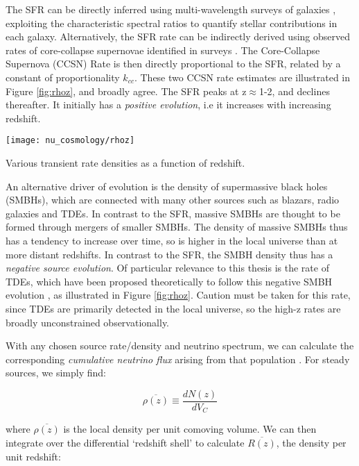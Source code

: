 The SFR can be directly inferred using multi-wavelength surveys of galaxies , exploiting the characteristic spectral ratios to quantify stellar contributions in each galaxy. Alternatively, the SFR rate can be indirectly derived using observed rates of core-collapse supernovae identified in surveys . The Core-Collapse Supernova (CCSN) Rate is then directly proportional to the SFR, related by a constant of proportionality $k_{cc}$. These two CCSN rate estimates are illustrated in Figure \ref{fig:rhoz}, and broadly agree. The SFR peaks at z$\approx$1-2, and declines thereafter. It initially has a \emph{positive evolution}, i.e it increases with increasing redshift. 
\begin{marginfigure}
	\centering \texttt{[image: nu\_cosmology/rhoz]}
	\caption{Various transient rate densities as a function of redshift.}
	\label{fig:rhoz}
\end{marginfigure}

An alternative driver of evolution is the density of supermassive black holes (SMBHs), which are connected with many other sources such as blazars, radio galaxies and TDEs. In contrast to the SFR, massive SMBHs are thought to be formed through mergers of smaller SMBHs. The density of massive SMBHs thus has a tendency to increase over time, so is higher in the local universe than at more distant redshifts. In contrast to the SFR, the SMBH density thus has a \emph{negative source evolution}. Of particular relevance to this thesis is the rate of TDEs, which have been proposed theoretically to follow this negative SMBH evolution  , as illustrated in Figure \ref{fig:rhoz}. Caution must be taken for this rate, since TDEs are primarily detected in the local universe, so the high-z rates are broadly unconstrained observationally. 

With any chosen source rate/density and neutrino spectrum, we can calculate the corresponding \emph{cumulative neutrino flux} arising from that population \cite{Strotjohann2020Search}. For steady sources, we simply find:

\begin{equation}
\overline{\rho(z)} \equiv \frac{dN(z)}{dV_{C}}
\end{equation}

where $\overline{\rho(z)}$ is the local density per unit comoving volume. We can then integrate over the differential `redshift shell' to calculate $\overline{R(z)}$, the density per unit redshift:

